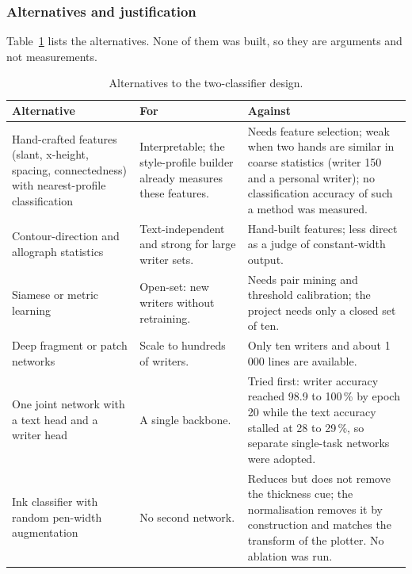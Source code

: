 \subsubsection{Alternatives and justification}

Table~\ref{tab:wid-alt} lists the alternatives.
None of them was built, so they are arguments and not measurements.

\begin{table}[h]
\centering
\fontsize{9.5}{11.5}\selectfont
\begin{tabularx}{\linewidth}{|p{3.4cm}|X|X|}
\hline
\textbf{Alternative} & \textbf{For} & \textbf{Against} \\
\hline
Hand-crafted features (slant, x-height, spacing, connectedness) with nearest-profile classification &
Interpretable; the style-profile builder already measures these features. &
Needs feature selection; weak when two hands are similar in coarse statistics (writer 150 and a personal writer); no classification accuracy of such a method was measured. \\
\hline
Contour-direction and allograph statistics~\cite{bulacu2007} &
Text-independent and strong for large writer sets. &
Hand-built features; less direct as a judge of constant-width output. \\
\hline
Siamese or metric learning &
Open-set: new writers without retraining. &
Needs pair mining and threshold calibration; the project needs only a closed set of ten. \\
\hline
Deep fragment or patch networks~\cite{he2020} &
Scale to hundreds of writers. &
Only ten writers and about 1\,000 lines are available. \\
\hline
One joint network with a text head and a writer head &
A single backbone. &
Tried first: writer accuracy reached 98.9 to 100\,\% by epoch 20 while the text accuracy stalled at 28 to 29\,\%, so separate single-task networks were adopted. \\
\hline
Ink classifier with random pen-width augmentation &
No second network. &
Reduces but does not remove the thickness cue; the normalisation removes it by construction and matches the transform of the plotter. No ablation was run. \\
\hline
\end{tabularx}
\caption{Alternatives to the two-classifier design.}
\label{tab:wid-alt}
\end{table}

